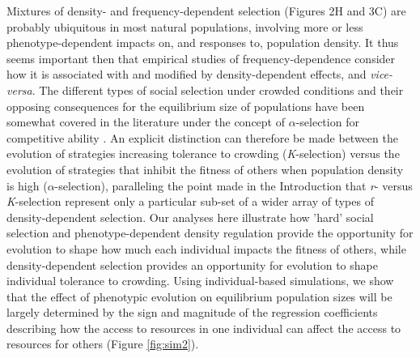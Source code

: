 \documentclass{article}
\begin{document}
Mixtures of density- and frequency-dependent selection (Figures 2H and 3C) are probably ubiquitous in most natural populations, involving more or less phenotype-dependent impacts on, and responses to, population density. It thus seems important then that empirical studies of frequency-dependence consider how it is associated with and modified by density-dependent effects, and \textit{vice-versa}. The different types of social selection under crowded conditions and their opposing consequences for the equilibrium size of populations have been somewhat covered in the literature under the concept of ${\alpha}$-selection for competitive ability \citep{Joshi2001}. An explicit distinction can therefore be made between the evolution of strategies increasing tolerance to crowding (\textit{K}-selection) versus the evolution of strategies that inhibit the fitness of others when population density is high (${\alpha}$-selection), paralleling the point made in the Introduction that \textit{r}- versus \textit{K}-selection represent only a particular sub-set of a wider array of types of density-dependent selection. Our analyses here illustrate how 'hard' social selection and phenotype-dependent density regulation provide the opportunity for evolution to shape how much each individual impacts the fitness of others, while density-dependent selection provides an opportunity for evolution to shape individual tolerance to crowding. Using individual-based simulations, we show that the effect of phenotypic evolution on equilibrium population sizes will be largely determined by the sign and magnitude of the regression coefficients describing how the access to resources in one individual can affect the access to resources for others (Figure \ref{fig:sim2}). 
\end{document}
